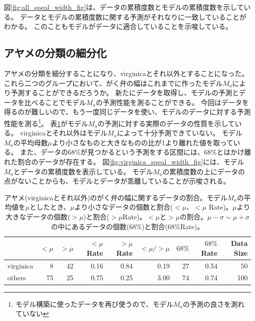 図\ref{fig:all_speal_width_fig}は、データの累積度数とモデルの累積度数を示している。
データとモデルの累積度数に関する予測がそれなりに一致していることがわかる。
このこともモデルがデータに適合していることを示唆している。

\subsection{アヤメの分類の細分化}
アヤメの分類を細分することになり、virginicaとそれ以外とすることになった。
これら二つのグループにおいて、がく弁の幅はこれまでに作ったモデル$M_a$により予測することができるだろうか。
新たにデータを取得し、モデルの予測とデータを比べることでモデル$M_a$の予測性能を測ることができる。
今回はデータを得るのが難しいので、もう一度同じデータを使い、モデルのデータに対する予測性能を測る\footnote{モデル構築に使ったデータを再び使うので、モデル$M_a$の予測の良さを測れていない}。
表\ref{table:speal_width_virig}がモデル$M_a$の予測に対する実際のデータの性質を示している。
virginicaとそれ以外はモデル$M_a$によって十分予測できていない。
モデル$M_a$の平均母数$\mu$より小さなものと大きなものの比が1より離れた値を取っている。
また、データの$68\%$が見つかるという予測をする区間には、$68\%$とはかけ離れた割合のデータが存在する。
図\ref{fig:virginica_speal_width_fig}には、モデル$M_a$とデータの累積度数を表示している。
モデル$M_a$の累積度数の上にデータの点がないことからも、モデルとデータが乖離していることが示唆される。
 

\begin{table}[h]
 \caption{アヤメ(virginicaとそれ以外)のがく弁の幅に関するデータの割合。モデル$M_a$の平均値を$\mu$としたとき、$\mu$より小さなデータの個数と割合($<\mu$、$<\mu$ Rate)。$\mu$より大きなデータの個数($>\mu$)と割合($>\mu$Rate)。$<\mu$と$>\mu$の割合。$\mu-\sigma\sim \mu+\sigma$の中にあるデータの個数($68\%$)と割合($68\%$Rate)。}
 \label{table:speal_width_virig}
 \centering
 \begin{tabular}{lrrrrrrrr}

  \hline
  {} &  $<\mu$ &  $>\mu$ &  $<\mu$ Rate &  $>\mu$ Rate &  $<\mu/>\mu$ &  $68\%$ &  $68\%$Rate &  Data Size \\
  \hline \hline
  virginica   &     8 &    42 &       0.16 &       0.84 &       0.19 &   27 &     0.54 &         50 \\
  others &    75 &    25 &       0.75 &       0.25 &       3.00 &   74 &     0.74 &        100 \\
  \hline
 \end{tabular}
\end{table}

